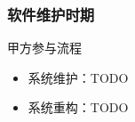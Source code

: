 \begin{frame}
    \frametitle{软件维护时期}
    \footnotesize
    \begin{block}{甲方参与流程}
        \begin{itemize}
            \item 系统维护：TODO
            \item 系统重构：TODO
        \end{itemize}
    \end{block}
\end{frame}





